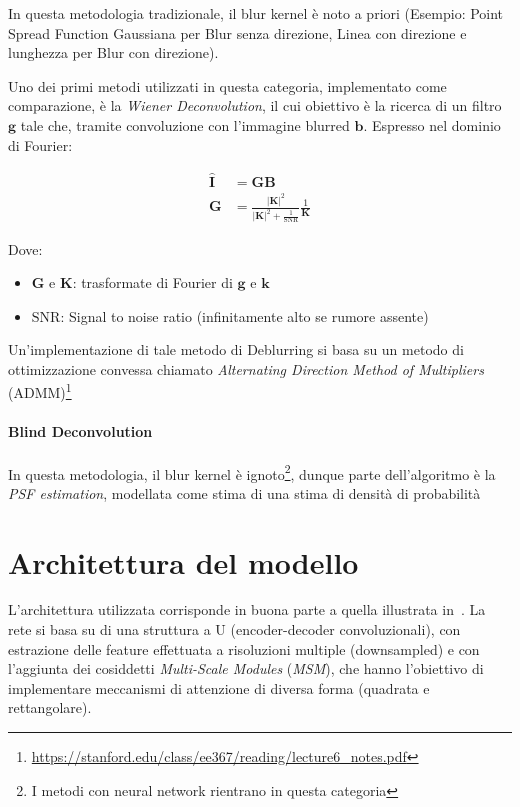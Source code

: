 \documentclass[a4paper,10pt,twocolumn]{article}
\begin{document}
In questa metodologia tradizionale, il blur kernel \`e noto a priori (Esempio: Point Spread Function Gaussiana per Blur senza direzione, Linea con direzione e lunghezza per Blur con direzione).\par
Uno dei primi metodi utilizzati in questa categoria, implementato come comparazione, \`e la \textit{Wiener Deconvolution}, il cui obiettivo \`e la ricerca di un filtro $\bm{g}$ tale che, tramite
convoluzione con l'immagine blurred $\bm{b}$. Espresso nel dominio di Fourier:

\begin{align}
    \hat{\bm{I}} &= \bm{G}\bm{B} \\
    \bm{G}       &= \frac{|\bm{K}|^2}{|\bm{K}|^2+\frac{1}{\mathrm{SNR}}} \frac{1}{\bm{K}}
\end{align}

Dove:

\begin{itemize}[topsep=0pt, noitemsep]
    \item[] $\bm{G}$ e $\bm{K}$: trasformate di Fourier di $\bm{g}$ e $\bm{k}$
    \item[] $\mathrm{SNR}$: Signal to noise ratio (infinitamente alto se rumore assente)
\end{itemize}

Un'implementazione di tale metodo di Deblurring si basa su un metodo di ottimizzazione convessa chiamato \textit{Alternating Direction Method of Multipliers} (ADMM)\footnote{\url{https://stanford.edu/class/ee367/reading/lecture6_notes.pdf}}

\paragraph*{Blind Deconvolution}

In questa metodologia, il blur kernel \`e ignoto\footnote{I metodi con neural network rientrano in questa categoria}, dunque parte dell'algoritmo \`e la \textit{PSF estimation}, modellata come
stima di una stima di densit\`a di probabilit\`a

\section{Architettura del modello}
L'architettura utilizzata corrisponde in buona parte a quella illustrata in~\cite{convir}. La rete si basa su di una struttura a U (encoder-decoder convoluzionali), con estrazione delle feature effettuata a risoluzioni multiple (downsampled)
e con l'aggiunta dei cosiddetti \textit{Multi-Scale Modules} (\textit{MSM}), che hanno l'obiettivo di implementare meccanismi di attenzione di diversa forma (quadrata e rettangolare).
\end{document}
